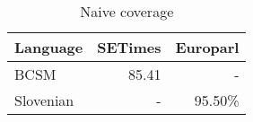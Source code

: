 \begin{table}
\begin{tabular}{lrr}

\textbf{Language} & \textbf{SETimes} & \textbf{Europarl}\\
\hline
BCSM & 85.41 & - \\
Slovenian &  - & 95.50\%\\
\hline
\end{tabular}
\caption{ Naive coverage }
\label{table:coverage}
\end{table}

